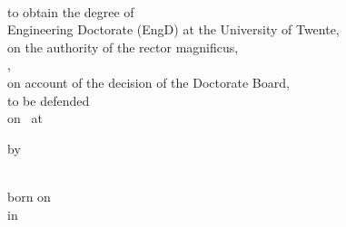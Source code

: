 
\makeatletter
{}

\thispagestyle{empty}
{\Huge
\begin{center}

\textbf{\thetitle}\\[18mm]

\theauthor
\end{center}
}
\clearpage


\thispagestyle{empty}

\cleardoublepage

\thispagestyle{empty}
{\LARGE
	\begin{center}
		
		\textbf{\MakeUppercase{\thetitle}}
		
		\vfill
		
		
		\vfill
		
		{\Large to obtain the degree of\\
            Engineering Doctorate (EngD) at the University of Twente,\\
			on the authority of the rector magnificus,\\
			\@UTRector,\\
			on account of the decision of the Doctorate Board,\\
			to be defended\\
			on \@DefenceDate\ at \@DefenceTime\\}
		
		\vfill
		
		{\Large by}
		
		\vfill
		
		{\textbf{\theauthor}\\
			born on \@BirthDate\\
			in \@PlaceofBirth}
	\end{center}
}
\clearpage


